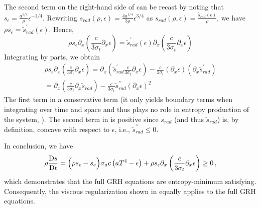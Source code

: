 \documentclass{mc2015}
\begin{document}
The second term on the right-hand side of  can be recast by noting that $s_\epsilon = \frac{a^{1/4}}{\rho} \epsilon^{-1/4}$. Rewriting $s_{rad}(\rho, \epsilon) = \frac{4a^{1/4}}{3\rho} \epsilon^{3/4}$ as  $s_{rad}(\rho, \epsilon) = \frac{\tilde{s}_{rad}(\epsilon)}{\rho}$, we have
$ \rho s_\epsilon = \tilde{s}^\prime_{rad}(\epsilon)$. Hence, 
\begin{equation}
\rho s_\epsilon \partial_x \left( \frac{c}{3 \sigma_t} \partial_x \epsilon \right) 
=
 \tilde{s}^\prime_{rad}(\epsilon) \partial_x \left( \frac{c}{3 \sigma_t} \partial_x \epsilon \right) 
\end{equation}
%
Integrating by parts, we obtain
%
\begin{multline} \label{eq:final_form_second_term}
\rho s_\epsilon \partial_x \left( \frac{c}{3 \sigma_t} \partial_x \epsilon \right) 
=
 \partial_x \left(  \tilde{s}^\prime_{rad}  \frac{c}{3 \sigma_t} \partial_x \epsilon \right) 
-
\frac{c}{3 \sigma_t} \left(  \partial_x \epsilon \right)  \left( \partial_x \tilde{s}^\prime_{rad}  \right) \\
=
 \partial_x \left(   \frac{c}{3 \sigma_t} \partial_x \tilde{s}_{rad}  \right) 
-
\frac{c}{3 \sigma_t} \tilde{s}^{\prime\prime}_{rad}  \left(  \partial_x \epsilon \right)^2   \qquad  \qquad  \qquad \ 
\end{multline}
%
The first term in  a conservative term (it only yields boundary terms when integrating over time and space and thus plays no role in entropy production of the system, \cite{Leveque}). The second term  in  is positive 
since $s_{rad}$ (and thus $\tilde{s}_{rad}$) is, by definition, concave with respect to $\epsilon$, i.e., $\tilde{s}^{\prime\prime}_{rad} \leq 0$.

In conclusion, we have 
\begin{equation} 
\rho \frac{\textrm{D} s}{\textrm{D} t} = \Big( \rho s_\epsilon -s_e \Big)  \sigma_a c \left( a T^4 - \epsilon \right) +   \rho s_\epsilon \partial_x \left( \frac{c}{3 \sigma_t} \partial_x \epsilon \right) \geq 0 \,,
\end{equation}
which demonstrates that the full GRH equations are entropy-minimum satisfying. Consequently, the viscous regularization shown in  equally applies to the full GRH equations. 

\end{document}
